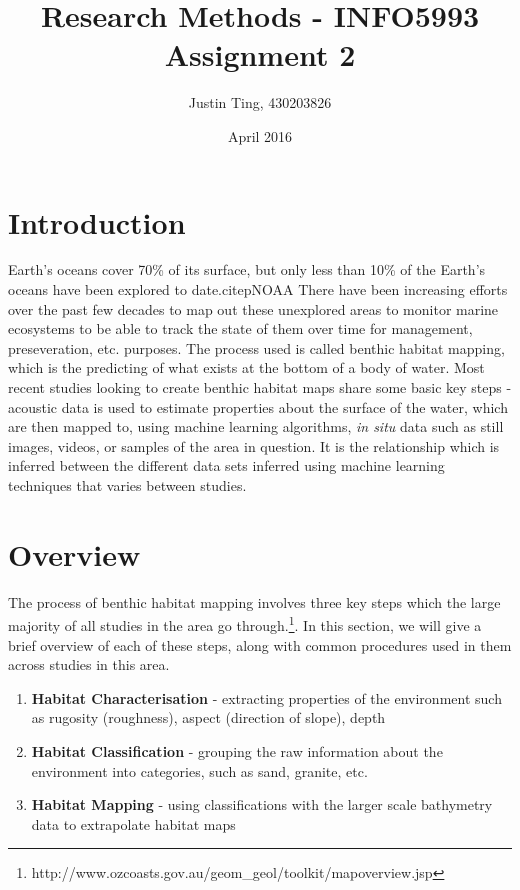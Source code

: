 \documentclass[12pt]{article}
\title{Research Methods - INFO5993 Assignment 2}
\author{Justin Ting, 430203826}
\date{April 2016}
\begin{document}
\maketitle

        \begin{multicols}{2}
            \section{Introduction}

            Earth's oceans cover 70\% of its surface, but only less than 10\% of the Earth's oceans have been explored to date.citep{NOAA} There have been increasing efforts over the past few decades to map out these unexplored areas to monitor marine ecosystems to be able to track the state of them over time for management, preseveration, etc. purposes. The process used is called benthic habitat mapping, which is the predicting of what exists at the bottom of a body of water. Most recent studies looking to create benthic habitat maps share some basic key steps - acoustic data is used to estimate properties about the surface of the water, which are then mapped to, using machine learning algorithms, \textit{in situ} data such as still images, videos, or samples of the area in question. It is the relationship which is inferred between the different data sets inferred using machine learning techniques that varies between studies.

            \section{Overview}
            The process of benthic habitat mapping involves three key steps which the large majority of all studies in the area go through.\footnote{http://www.ozcoasts.gov.au/geom\_geol/toolkit/mapoverview.jsp}. In this section, we will give a brief overview of each of these steps, along with common procedures used in them across studies in this area.

            \begin{enumerate}
                \item \textbf{Habitat Characterisation} - extracting properties of the environment such as rugosity (roughness), aspect (direction of slope), depth
                \item \textbf{Habitat Classification} - grouping the raw information about the environment into categories, such as sand, granite, etc.
                \item \textbf{Habitat Mapping} - using classifications with the larger scale bathymetry data to extrapolate habitat maps 
            \end{enumerate}


\end{multicols}
\end{document}
